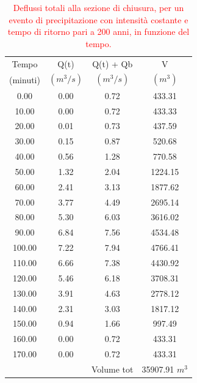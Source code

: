 \begin{table}[H] \centering
    \caption{\textcolor{red}{Deflussi totali alla sezione di chiusura, per un evento di precipitazione con intensità costante e tempo di ritorno pari a 200 anni, in funzione del tempo.}}
    \begin{tabular}{cccc}
        \toprule
        Tempo    & Q(t)   & Q(t) + Qb           & V                 \\
        (minuti) & $(m^3/s)$ & $(m^3/s)$ & $(m^3)$              \\
        \midrule
        0.00     & 0.00   & 0.72                & 433.31            \\
        10.00    & 0.00   & 0.72                & 433.33            \\
        20.00    & 0.01   & 0.73                & 437.59            \\
        30.00    & 0.15   & 0.87                & 520.68            \\
        40.00    & 0.56   & 1.28                & 770.58            \\
        50.00    & 1.32   & 2.04                & 1224.15           \\
        60.00    & 2.41   & 3.13                & 1877.62           \\
        70.00    & 3.77   & 4.49                & 2695.14           \\
        80.00    & 5.30   & 6.03                & 3616.02           \\
        90.00    & 6.84   & 7.56                & 4534.48           \\
        100.00   & 7.22   & 7.94                & 4766.41           \\
        110.00   & 6.66   & 7.38                & 4430.92           \\
        120.00   & 5.46   & 6.18                & 3708.31           \\
        130.00   & 3.91   & 4.63                & 2778.12           \\
        140.00   & 2.31   & 3.03                & 1817.12           \\
        150.00   & 0.94   & 1.66                & 997.49            \\
        160.00   & 0.00   & 0.72                & 433.31            \\
        170.00   & 0.00   & 0.72                & 433.31            \\
        \bottomrule
                 &        & Volume tot & 35907.91 $m^3$
        \end{tabular}
        \end{table}

